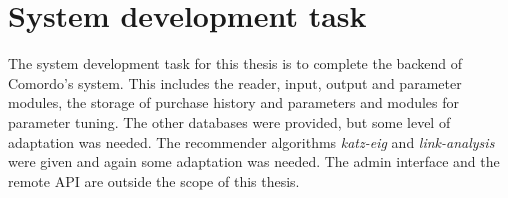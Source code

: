 
\section{System development task}\label{sec:task}

The system development task for this thesis is to complete the backend of Comordo's system. This includes the reader, input, output and parameter modules, the storage of purchase history and parameters and modules for parameter tuning. The other databases were provided, but some level of adaptation was needed. The recommender algorithms \textit{katz-eig} and \textit{link-analysis} were given and again some adaptation was needed. The admin interface and the remote API are outside the scope of this thesis.

